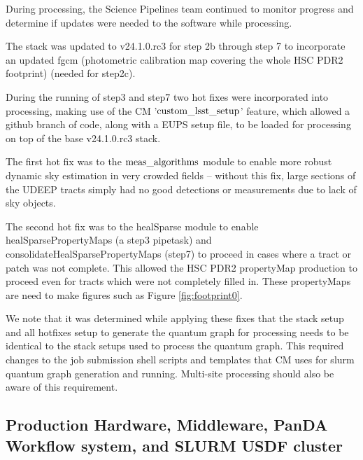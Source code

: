 During processing, the Science Pipelines team continued to monitor progress and determine if updates were
needed to the software while processing.

The stack was updated to v24.1.0.rc3 for step 2b through step 7 to incorporate an updated fgcm (photometric
calibration map covering the whole HSC PDR2 footprint)  (needed for step2c).

During the running of step3 and step7 two hot fixes were incorporated into processing, making use
of the CM '$\rm custom\_lsst\_setup$' feature, which allowed a github branch of code, along with a EUPS setup
file, to be loaded for processing on top of the base v24.1.0.rc3 stack.

The first hot fix was to the $\rm meas\_algorithms$ module to enable more robust dynamic sky estimation in very
crowded fields -- without this fix, large sections of the UDEEP tracts simply had no good detections or
measurements due to lack of sky objects.

The second hot fix was to the healSparse module to enable healSparsePropertyMaps (a step3 pipetask) and 
consolidateHealSparsePropertyMaps (step7) to proceed in cases where a tract or patch was not complete.
This allowed the HSC PDR2 propertyMap production to proceed even for tracts which were 
not completely filled in. These propertyMaps are need to make figures such as Figure \ref{fig:footprint0}.

We note that it was determined while applying these fixes that the stack setup and all 
hotfixes setup to generate the quantum graph for processing needs to be identical to 
the stack setups used to process the quantum graph.  This required changes to the 
job submission shell scripts and templates that CM uses for slurm quantum 
graph generation and running.   Multi-site processing should also be aware of this requirement.

\subsection{Production Hardware, Middleware, PanDA Workflow system, and SLURM USDF cluster}

